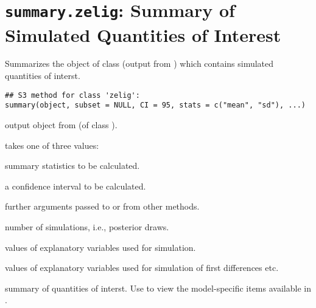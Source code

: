  \section{{\tt summary.zelig}: Summary of Simulated Quantities of Interest}\label{ss:summary.zelig}
\begin{Description}\relax
Summarizes the object of class  (output
from ) which contains simulated quantities of
interst.
\end{Description}
\begin{Usage}
\begin{verbatim}
## S3 method for class 'zelig':
summary(object, subset = NULL, CI = 95, stats = c("mean", "sd"), ...)
\end{verbatim}
\end{Usage}
\begin{Arguments}
\begin{ldescription}
\item[\code{object}] output object from  (of class
).
\item[\code{subset}] takes one of three values:

\item[\code{stats}] summary statistics to be calculated.
\item[\code{CI}] a confidence interval to be calculated.
\item[\code{...}] further arguments passed to or from other methods.
\end{ldescription}
\end{Arguments}
\begin{Value}
\begin{ldescription}
\item[\code{sim}] number of simulations, i.e., posterior draws.
\item[\code{x}] values of explanatory variables used for simulation.
\item[\code{x1}] values of explanatory variables used for simulation of first
differences etc.
\item[\code{qi.stats}] summary of quantities of interst.  Use
 to view the model-specific items available in
.
\end{ldescription}
\end{Value}
